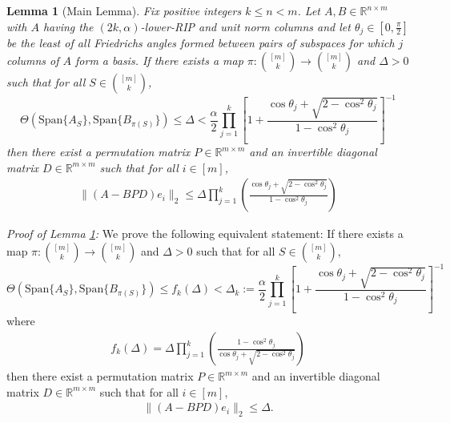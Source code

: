 \documentclass[journal,onecolumn]{IEEEtran}
\newtheorem{lemma}{Lemma}
\begin{document}
\begin{lemma}[Main Lemma]\label{MainLemma}
Fix positive integers $k \leq n < m$. Let $A,B \in \mathbb{R}^{n \times m}$ with $A$ having the $(2k,\alpha)$-lower-RIP and unit norm columns and let $\theta_j \in [0, \frac{\pi}{2}]$ be the least of all Friedrichs angles formed between pairs of subspaces for which $j$ columns of $A$ form a basis. If there exists a map $\pi: {[m] \choose k} \to {[m] \choose k}$ and $\Delta > 0$ such that for all $S \in {[m] \choose k}$, 
\begin{equation}
\Theta(\text{Span}\{A_S\}, \text{Span}\{B_{\pi(S)}\}) \leq \Delta < \frac{\alpha}{2} \prod_{j=1}^k \left[ 1 + \frac{\cos\theta_j + \sqrt{2 - \cos^2\theta_j}}{1 - \cos^2\theta_j} \right]^{-1}
\end{equation}
%
then there exist a permutation matrix $P \in \mathbb{R}^{m \times m}$ and an invertible diagonal matrix $D \in \mathbb{R}^{m \times m}$ such that for all $i \in [m]$,
\begin{align}
\|(A - BPD)e_i\|_2 \leq \Delta \prod_{j=1}^k \left( \frac{ \cos\theta_j + \sqrt{2 - \cos^2\theta_j} }{ 1 - \cos^2\theta_j } \right)
\end{align}
\end{lemma}

\emph{Proof of Lemma \ref{MainLemma}:} We prove the following equivalent statement: If there exists a map $\pi: {[m] \choose k} \to {[m] \choose k}$ and $\Delta > 0$ such that for all $S \in {[m] \choose k}$, 
\begin{equation}\label{SubspaceDistanceUpperBound}
\Theta(\text{Span}\{A_S\}, \text{Span}\{B_{\pi(S)}\}) \leq f_k(\Delta) < 
\Delta_k := \frac{\alpha}{2} \prod_{j=1}^k \left[ 1 + \frac{\cos\theta_j + \sqrt{2 - \cos^2\theta_j}}{1 - \cos^2\theta_j} \right]^{-1}
\end{equation}
%
where
\begin{align}
f_k(\Delta) = \Delta \prod_{j=1}^k \left( \frac{ 1 - \cos^2\theta_j }{ \cos\theta_j + \sqrt{2 - \cos^2\theta_j} } \right)
\end{align}
%
then there exist a permutation matrix $P \in \mathbb{R}^{m \times m}$ and an invertible diagonal matrix $D \in \mathbb{R}^{m \times m}$ such that for all $i \in [m]$,
\begin{align}
\|(A - BPD)e_i\|_2 \leq \Delta .
\end{align}
\end{document}
